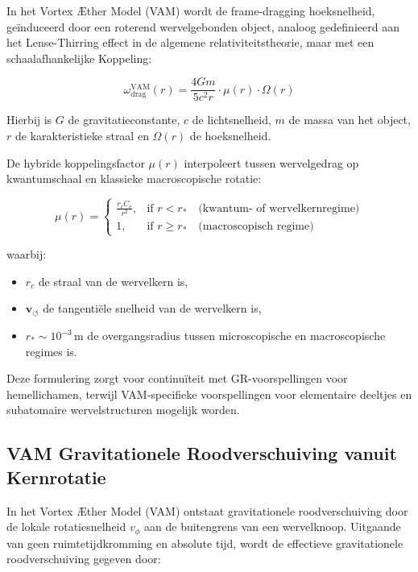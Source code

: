 In het Vortex Æther Model (VAM) wordt de frame-dragging hoeksnelheid, geïnduceerd door een roterend wervelgebonden object, analoog gedefinieerd aan het Lense-Thirring effect in de algemene relativiteitstheorie, maar met een schaalafhankelijke Koppeling:

\begin{equation}
    \omega_\text{drag}^\text{VAM}(r) =
    \frac{4 G m}{5 c^2 r} \cdot \mu(r) \cdot \Omega(r)
\end{equation}

Hierbij is \( G \) de gravitatieconstante, \( c \) de lichtsnelheid, \( m \) de massa van het object, \( r \) de karakteristieke straal en \( \Omega(r) \) de hoeksnelheid.

De hybride koppelingsfactor \( \mu(r) \) interpoleert tussen wervelgedrag op kwantumschaal en klassieke macroscopische rotatie:

\begin{equation}
    \mu(r) =
    \begin{cases}
        \displaystyle \frac{r_c C_e}{r^2}, & \text{if } r < r_\ast \quad \text{(kwantum- of wervelkernregime)} \\
        1, & \text{if } r \geq r_\ast \quad \text{(macroscopisch regime)}
    \end{cases}
\end{equation}

waarbij:
\begin{itemize}
    \item \( r_c \) de straal van de wervelkern is,
    \item \( \mathbf{v}_{\scriptscriptstyle\boldsymbol{\circlearrowleft}} \) de tangentiële snelheid van de wervelkern is,
    \item \( r_\ast \sim 10^{-3} \, \text{m} \) de overgangsradius tussen microscopische en macroscopische regimes is.
\end{itemize}

Deze formulering zorgt voor continuïteit met GR-voorspellingen voor hemellichamen, terwijl VAM-specifieke voorspellingen voor elementaire deeltjes en subatomaire wervelstructuren mogelijk worden.


\subsection*{VAM Gravitationele Roodverschuiving vanuit Kernrotatie}

In het Vortex Æther Model (VAM) ontstaat gravitationele roodverschuiving door de lokale rotatiesnelheid \( v_\phi \) aan de buitengrens van een wervelknoop. Uitgaande van geen ruimtetijdkromming en absolute tijd, wordt de effectieve gravitationele roodverschuiving gegeven door:

